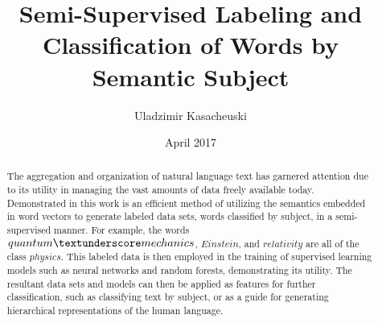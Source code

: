 \documentclass[%
 reprint,
 amsmath,amssymb,
 aps,
]{revtex4-1}
\begin{document}
\title{Semi-Supervised Labeling and Classification of Words by Semantic Subject}


\author{Uladzimir Kasacheuski}%

%
\date{April 2017}



\begin{abstract}

The aggregation and organization of natural language text has garnered attention due to its utility in managing the vast amounts of data freely available today. Demonstrated in this work is an efficient method of utilizing the semantics embedded in word vectors to generate labeled data sets, words classified by subject, in a semi-supervised manner. For example, the words $quantum \textunderscore mechanics$, $Einstein$, and $relativity$ are all of the class $physics$. This labeled data is then employed in the training of supervised learning models such as neural networks and random forests, demonstrating its utility. The resultant data sets and models can then be applied as features for further classification, such as classifying text by subject, or as a guide for generating hierarchical representations of the human language. 


\end{abstract}
\maketitle
\end{document}
